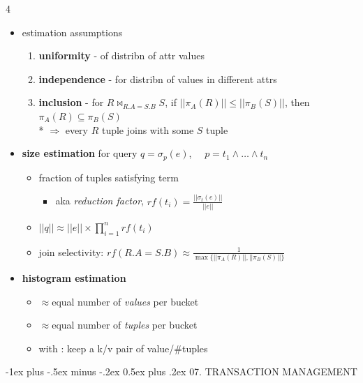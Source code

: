 \documentclass{article}
\makeatletter
\renewcommand{\section}{\@startsection{section}{1}{0mm}%
    {-1ex plus -.5ex minus -.2ex}%
    {0.5ex plus .2ex}%
{\normalfont\small\bfseries}}
\makeatother
\begin{document}
\begin{multicols*}{4}
\begin{scriptsize}
  \begin{itemize}
    \item estimation assumptions
      \begin{enumerate}
        \item \textbf{uniformity} - of distribn of attr values
        \item \textbf{independence} - for distribn of values in different attrs
        \item \textbf{inclusion} - for $R \bowtie_{R.A=S.B}S$, if $||\pi_A(R)|| \leq ||\pi_B(S)||$, then $\pi_A(R) \subseteq \pi_B(S)$ 
          \\* $\Rightarrow$ every $R$ tuple joins with some $S$ tuple
      \end{enumerate}
    \item \textbf{size estimation} for query $q = \sigma_p(e)$,  $\quad p = t_1 \land \dots \land t_n$
      \begin{itemize}
        \item {} fraction of tuples satisfying term
          \begin{itemize}
            \item aka \textit{reduction factor}, $rf(t_i) = \frac{||\sigma_t(e)||}{||e||}$
          \end{itemize}
        \item $||q|| \approx ||e|| \times \prod^n_{i=1}rf(t_i)$
        \item join selectivity: $rf(R.A=S.B) \approx \frac{1}{\max\{||\pi_A(R)||, ||\pi_B(S)||\}}$
      \end{itemize}
    \item \textbf{histogram estimation}
      \begin{itemize}
        \item {} $\approx$equal number of \textit{values} per bucket
        \item {} $\approx$equal number of \textit{tuples} per bucket
        \item with : keep a k/v pair of value/\#tuples
      \end{itemize}
  \end{itemize}

  \section{07. TRANSACTION MANAGEMENT}


\end{scriptsize}
\end{multicols*}
\end{document}
